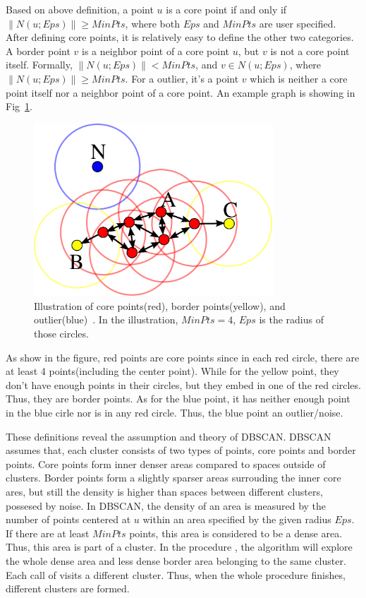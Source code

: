 Based on above definition, a point $u$ is a core point if and only if $\|N(u;Eps)\| \geq MinPts$, where both $Eps$ and $MinPts$ are user specified. After defining core points, it is relatively easy to define the other two categories. A border point $v$ is a neighbor point of a core point $u$, but $v$ is not a core point itself. Formally, $\|N(u;Eps)\| < MinPts$, and $v \in N(u;Eps)$, where $\|N(u;Eps)\| \geq MinPts$. For a outlier, it's a point $v$ which is neither a core point itself nor a neighbor point of a core point. An example graph is showing in Fig~\ref{fig:DBSCANConcept}.

\begin{figure}[ht]
	\begin{center}
		\includegraphics[width=0.8\textwidth]{images/DBSCAN-Illustration.png}
		\caption{Illustration of core points(red), border points(yellow), and outlier(blue)~\cite{wiki:DBSCAN}. In the illustration, $MinPts = 4$, $Eps$ is the radius of those circles.}
		\label{fig:DBSCANConcept}
	\end{center}
\end{figure}

As show in the figure, red points are core points since in each red circle, there are at least 4 points(including the center point). While for the yellow point, they don't have enough points in their circles, but they embed in one of the red circles. Thus, they are border points. As for the blue point, it has neither enough point in the blue cirle nor is in any red circle. Thus, the blue point an outlier/noise.

These definitions reveal the assumption and theory of DBSCAN. DBSCAN assumes that, each cluster consists of two types of points, core points and border points. Core points form inner denser areas compared to spaces outside of clusters. Border points form a slightly sparser areas surrouding the inner core ares, but still the density is higher than spaces between different clusters, possesed by noise. In DBSCAN, the density of an area is measured by the number of points centered at $u$ within an area specified by the given radius $Eps$. If there are at least $MinPts$ points, this area is considered to be a dense area. Thus, this area is part of a cluster. In the procedure , the algorithm will explore the whole dense area and less dense border area belonging to the same cluster. Each call of  visits a different cluster. Thus, when the whole procedure  finishes, different clusters are formed.

